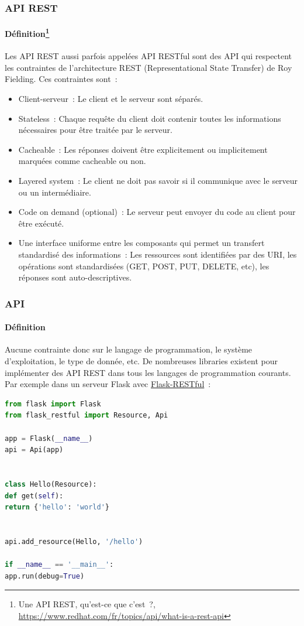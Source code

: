 \documentclass{beamer}
\begin{document}
    \begin{frame}
        \transdissolve
        \frametitle{API REST}
        \framesubtitle{Définition\footnote{Une API REST, qu'est-ce que c'est~?, \url{https://www.redhat.com/fr/topics/api/what-is-a-rest-api}}}
        \begin{footnotesize}
            Les API REST aussi parfois appelées API RESTful sont des API qui respectent les contraintes de l'architecture REST (Representational State Transfer) de Roy Fielding.
            \bigbreak
            Ces contraintes sont~:
            \begin{itemize}
                \item Client-serveur~: Le client et le serveur sont séparés.
                \item Stateless~: Chaque requête du client doit contenir toutes les informations nécessaires pour être traitée par le serveur.
                \item Cacheable~: Les réponses doivent être explicitement ou implicitement marquées comme cacheable ou non.
                \item Layered system~: Le client ne doit pas savoir si il communique avec le serveur ou un intermédiaire.
                \item Code on demand (optional)~: Le serveur peut envoyer du code au client pour être exécuté.
                \item Une interface uniforme entre les composants qui permet un transfert standardisé des informations~: Les ressources sont identifiées par des URI, les opérations sont standardisées (GET, POST, PUT, DELETE, etc), les réponses sont auto-descriptives.
            \end{itemize}
        \end{footnotesize}
    \end{frame}

    \begin{frame}[fragile]
        \transdissolve
        \frametitle{API}
        \framesubtitle{Définition}
        Aucune contrainte donc sur le langage de programmation, le système d'exploitation, le type de donnée, etc.
        \bigbreak
        De nombreuses libraries existent pour implémenter des API REST dans tous les langages de programmation courants.
        \bigbreak
        Par exemple dans un serveur Flask avec \href{https://flask-restful.readthedocs.io/en/latest/}{Flask-RESTful}~:
        \begin{lstlisting}[language=python,basicstyle=\ttfamily\tiny]
from flask import Flask
from flask_restful import Resource, Api

app = Flask(__name__)
api = Api(app)


class Hello(Resource):
def get(self):
return {'hello': 'world'}


api.add_resource(Hello, '/hello')

if __name__ == '__main__':
app.run(debug=True)
        \end{lstlisting}
    \end{frame}
\end{document}
